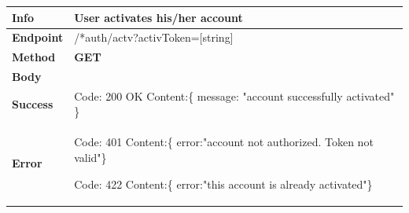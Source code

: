 

\begin{table}[H]
\begin{tabular}{|l|p{}|}
\hline
\textbf{Info}             & User activates his/her account                                                                         \\ \hline
\textbf{Endpoint}    & /*auth/actv?activToken=[string] \\ \hline
\textbf{Method}         &   \textbf{GET}                                                                            \\ \hline

\textbf{Body}  &   \\ \hline
                    
\textbf{Success} &  Code: 200 OK \newline
                    Content:\{\newline 
                    message: "account successfully activated"\newline 
                    \}\\ \hline
\textbf{Error} &  Code: 401 \newline
                  Content:\{\newline
                  error:"account not authorized. Token not valid"\newline\}\newline
                  
                  Code: 422 \newline
                  Content:\{\newline
                  error:"this account is already activated"\newline\}\\\hline

\end{tabular}
\end{table}






